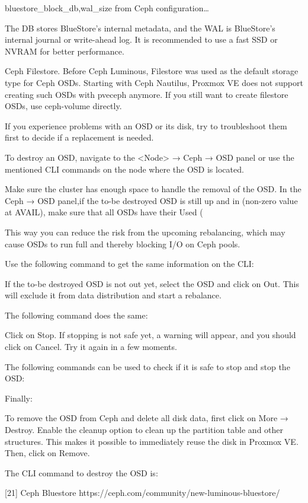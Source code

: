 bluestore_block_{db,wal}_size from Ceph configuration…

The DB stores BlueStore’s internal metadata, and the WAL is BlueStore’s internal journal or write-ahead log. It is recommended to use a fast SSD or NVRAM for better performance.

Ceph Filestore. Before Ceph Luminous, Filestore was used as the default storage type for Ceph OSDs. Starting with Ceph Nautilus, Proxmox VE does not support creating such OSDs with pveceph anymore. If you still want to create filestore OSDs, use ceph-volume directly.

If you experience problems with an OSD or its disk, try to troubleshoot them first to decide if a replacement is needed.

To destroy an OSD, navigate to the <Node> → Ceph → OSD panel or use the mentioned CLI commands on the node where the OSD is located.

Make sure the cluster has enough space to handle the removal of the OSD. In the Ceph → OSD panel,if the to-be destroyed OSD is still up and in (non-zero value at AVAIL), make sure that all OSDs have their Used (%

This way you can reduce the risk from the upcoming rebalancing, which may cause OSDs to run full and thereby blocking I/O on Ceph pools.

Use the following command to get the same information on the CLI:

If the to-be destroyed OSD is not out yet, select the OSD and click on Out. This will exclude it from data distribution and start a rebalance.

The following command does the same:

Click on Stop. If stopping is not safe yet, a warning will appear, and you should click on Cancel. Try it again in a few moments.

The following commands can be used to check if it is safe to stop and stop the OSD:

Finally:

To remove the OSD from Ceph and delete all disk data, first click on More → Destroy. Enable the cleanup option to clean up the partition table and other structures. This makes it possible to immediately reuse the disk in Proxmox VE. Then, click on Remove.

The CLI command to destroy the OSD is:

[21] Ceph Bluestore https://ceph.com/community/new-luminous-bluestore/

